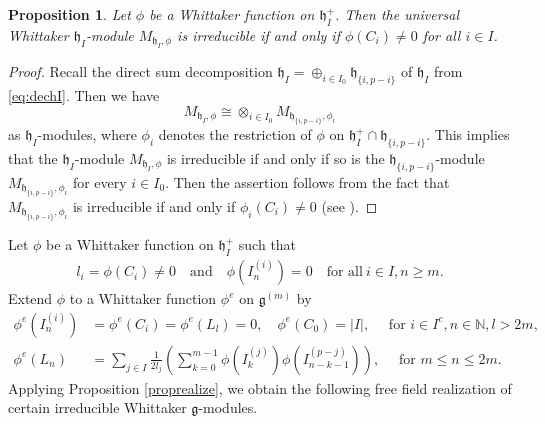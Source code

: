 \documentclass[12pt, reqno]{amsart}
\numberwithin{equation}{section}
\newtheorem{proposition}[theorem]{Proposition}%
\numberwithin{equation}{section}
\def\h{\mathfrak{h}}
\def\g{\mathfrak{g}}
\def\({\left(}
\def\){\right)}
\newcommand{\N}{\mathbb{N}}
\begin{document}
\begin{proposition}\label{prophimod}
 Let $\phi$ be a Whittaker function on $\h_I^+$.
 Then the universal Whittaker $\h_I$-module $M_{\h_I,\phi}$ is irreducible
 if and only if  $\phi(C_i)\ne 0$ for all $i\in I$.
\end{proposition}
\begin{proof}
 Recall the direct sum decomposition $\h_I=\oplus_{i\in I_0}\h_{\{i,p-i\}}$ of $\h_I$ from \eqref{eq:dechI}.
 Then we have
 \[
   M_{\h_I,\phi}\cong\otimes_{i\in I_0} M_{\h_{\{i,p-i\}},\phi_i}
 \]
 as $\h_I$-modules, where $\phi_i$ denotes the restriction of $\phi$ on $\h_I^+\cap \h_{\{i,p-i\}}$.
 This implies that the $\h_I$-module $M_{\h_I,\phi}$ is irreducible if and only if so is the $\h_{\{i,p-i\}}$-module $M_{\h_{\{i,p-i\}},\phi_i}$ for every $i\in I_0$.
 Then the assertion follows from the fact that $M_{\h_{\{i,p-i\}},\phi_i}$ is irreducible if and only if $\phi_i(C_i)\neq0$ (see \cite{Chr}).
\end{proof}

Let $\phi$ be a Whittaker function on $\h_I^+$ such that
\begin{eqnarray}\label{eq:cononphi}
    l_i=\phi(C_i)\ne 0\quad \text{and}\quad \phi(I_n^{(i)})=0\quad \text{for all}\ i\in I, n\ge m.
\end{eqnarray}
Extend $\phi$ to a Whittaker function $\phi^e$ on $\g^{(m)}$ by
\begin{equation}\begin{aligned}\label{eq:defphie}
    \phi^e(I_n^{(i)})&=\phi^e(C_i)=\phi^e(L_l)=0,\quad
    \phi^e(C_0)=|I|,\quad \text{ for }i\in I^c, n\in \N, l>2m, \\
    \phi^e(L_n)&=\sum\limits_{j\in I}\frac1{2l_j}\left(\sum\limits_{k=0}^{m-1}
                            \phi\(I_k^{(j)}\)\phi\(I_{n-k-1}^{(p-j)}\)\right),
    \quad \text{ for }m\le n\le 2m.
\end{aligned}
\end{equation}
Applying Proposition \ref{proprealize}, we obtain the following free field realization of certain irreducible Whittaker $\g$-modules.
\end{document}
